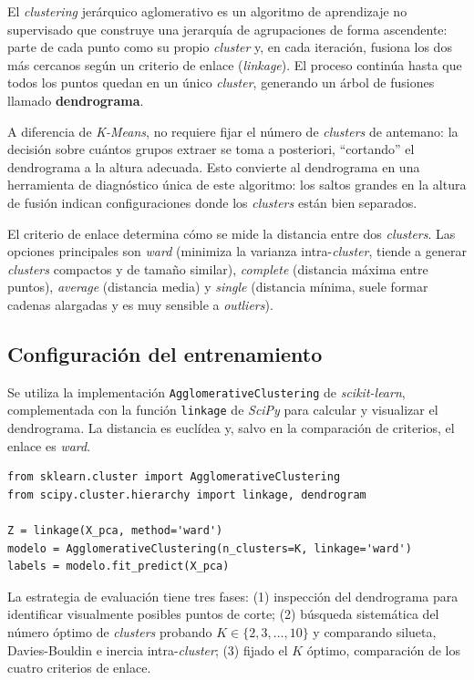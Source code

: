 \documentclass[11pt,a4paper]{article}
\begin{document}
El \textit{clustering} jerárquico aglomerativo es un algoritmo de aprendizaje no supervisado que construye una jerarquía de agrupaciones de forma ascendente: parte de cada punto como su propio \textit{cluster} y, en cada iteración, fusiona los dos más cercanos según un criterio de enlace (\textit{linkage}). El proceso continúa hasta que todos los puntos quedan en un único \textit{cluster}, generando un árbol de fusiones llamado \textbf{dendrograma}.

A diferencia de \textit{K-Means}, no requiere fijar el número de \textit{clusters} de antemano: la decisión sobre cuántos grupos extraer se toma a posteriori, ``cortando'' el dendrograma a la altura adecuada. Esto convierte al dendrograma en una herramienta de diagnóstico única de este algoritmo: los saltos grandes en la altura de fusión indican configuraciones donde los \textit{clusters} están bien separados.

El criterio de enlace determina cómo se mide la distancia entre dos \textit{clusters}. Las opciones principales son \textit{ward} (minimiza la varianza intra-\textit{cluster}, tiende a generar \textit{clusters} compactos y de tamaño similar), \textit{complete} (distancia máxima entre puntos), \textit{average} (distancia media) y \textit{single} (distancia mínima, suele formar cadenas alargadas y es muy sensible a \textit{outliers}).

\subsection{Configuración del entrenamiento}

Se utiliza la implementación \texttt{AgglomerativeClustering} de \textit{scikit-learn}, complementada con la función \texttt{linkage} de \textit{SciPy} para calcular y visualizar el dendrograma. La distancia es euclídea y, salvo en la comparación de criterios, el enlace es \textit{ward}.

\begin{lstlisting}
from sklearn.cluster import AgglomerativeClustering
from scipy.cluster.hierarchy import linkage, dendrogram

Z = linkage(X_pca, method='ward')
modelo = AgglomerativeClustering(n_clusters=K, linkage='ward')
labels = modelo.fit_predict(X_pca)
\end{lstlisting}

La estrategia de evaluación tiene tres fases: (1) inspección del dendrograma para identificar visualmente posibles puntos de corte; (2) búsqueda sistemática del número óptimo de \textit{clusters} probando $K \in \{2, 3, \ldots, 10\}$ y comparando silueta, Davies-Bouldin e inercia intra-\textit{cluster}; (3) fijado el $K$ óptimo, comparación de los cuatro criterios de enlace.
\end{document}
